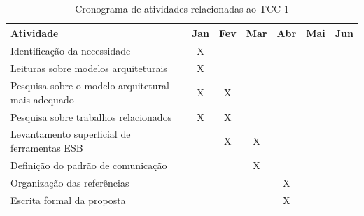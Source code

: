 \begin{table}[!h]
\centering
\caption{Cronograma de atividades relacionadas ao TCC 1}
\label{cronograma_tcc1}
\begin{tabular}{|p{9cm}|c|c|c|c|c|c|}
\hline
Atividade                                                   & \multicolumn{1}{l|}{Jan} & \multicolumn{1}{l|}{Fev} & \multicolumn{1}{l|}{Mar} & \multicolumn{1}{l|}{Abr} & \multicolumn{1}{l|}{Mai} & \multicolumn{1}{l|}{Jun} \\ \hline
Identificação da necessidade                                & X                           &                             &                              &                            &                             &                              \\ \hline
Leituras sobre modelos arquiteturais                        & X                           &                             &                              &                            &                             &                              \\ \hline
Pesquisa sobre o modelo arquitetural mais adequado          & X                           & X                             &                              &                            &                             &                              \\ \hline
Pesquisa sobre trabalhos relacionados                       & X                           & X                        &                              &                            &                             &                              \\ \hline
Levantamento superficial de ferramentas ESB                 &                             & X                        & X                            &                            &                             &                              \\ \hline
Definição do padrão de comunicação                          &                             &                          & X                            &                            &                             &                              \\ \hline
Organização das referências                                 &                             &                             &                              & X                          &                             &           \\ \hline
Escrita formal da proposta                                  &                             &                             &                              & X                          &                             &           \\ \hline

\end{tabular}
\end{table}
